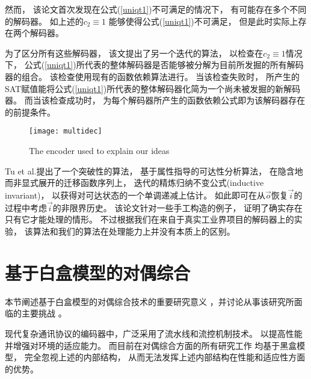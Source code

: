 然而，
该论文首次发现在公式(\ref{uniqt1})不可满足的情况下，
有可能存在多个不同的解码器。
如上述的$c_2\equiv 1$
能够使得公式(\ref{uniqt1})不可满足，
但是此时实际上存在两个解码器。

为了区分所有这些解码器，
该文提出了另一个迭代的算法，
以检查在$c_2\equiv 1$情况下，
公式(\ref{uniqt1})所代表的整体解码器是否能够被分解为目前所发掘的所有解码器的组合。
该检查使用现有的函数依赖算法进行。
当该检查失败时，
所产生的SAT赋值能将公式(\ref{uniqt1})所代表的整体解码器化简为一个尚未被发掘的新解码器。
而当该检查成功时，
为每个解码器所产生的函数依赖公式即为该解码器存在的前提条件。

\begin{figure}[t]
\begin{center}
\texttt{[image: multidec]}
\end{center}
\caption{The encoder used to explain our ideas}
  \label{multidec}
\end{figure}

Tu et al.提出了一个突破性的算法，
基于属性指导的可达性分析算法，
在隐含地而非显式展开的迁移函数序列上，
迭代的精炼归纳不变公式(inductive invariant)，
以获得对可达状态的一个单调递减上估计。
如此即可在从$\vec{o}$恢复$\vec{i}$的过程中考虑$\vec{i}$的非限界历史。
该论文针对一些手工构造的例子，
证明了确实存在只有它才能处理的情形。
不过根据我们在来自于真实工业界项目的解码器上的实验，
该算法和我们的算法在处理能力上并没有本质上的区别。



\section{基于白盒模型的对偶综合}\label{sec_whiteboxtodo}
本节阐述基于白盒模型的对偶综合技术的重要研究意义
，并讨论从事该研究所面临的主要挑战
。




现代复杂通讯协议的编码器中，广泛采用了流水线和流控机制技术。
以提高性能并增强对环境的适应能力。
而目前在对偶综合方面的所有研究工作
均基于黑盒模型，
完全忽视上述的内部结构，
从而无法发挥上述内部结构在性能和适应性方面的优势。

